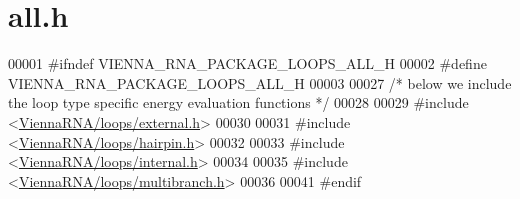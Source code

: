 \hypertarget{all_8h_source}{}\section{all.\+h}
\label{all_8h_source}

\begin{DoxyCode}
00001 \textcolor{preprocessor}{#ifndef VIENNA\_RNA\_PACKAGE\_LOOPS\_ALL\_H}
00002 \textcolor{preprocessor}{#define VIENNA\_RNA\_PACKAGE\_LOOPS\_ALL\_H}
00003 
00027 \textcolor{comment}{/* below we include the loop type specific energy evaluation functions */}
00028 
00029 \textcolor{preprocessor}{#include <\hyperlink{external_8h}{ViennaRNA/loops/external.h}>}
00030 
00031 \textcolor{preprocessor}{#include <\hyperlink{hairpin_8h}{ViennaRNA/loops/hairpin.h}>}
00032 
00033 \textcolor{preprocessor}{#include <\hyperlink{internal_8h}{ViennaRNA/loops/internal.h}>}
00034 
00035 \textcolor{preprocessor}{#include <\hyperlink{multibranch_8h}{ViennaRNA/loops/multibranch.h}>}
00036 
00041 \textcolor{preprocessor}{#endif}
\end{DoxyCode}
